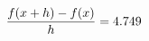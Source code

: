 \documentclass[preview]{standalone}
\begin{document}
\begin{align*}
\special{dvisvgm:raw <g id='unique000'>}\frac{f(x+h)-f(x)}{h} = 4.749\special{dvisvgm:raw </g>}
\end{align*}
\end{document}
